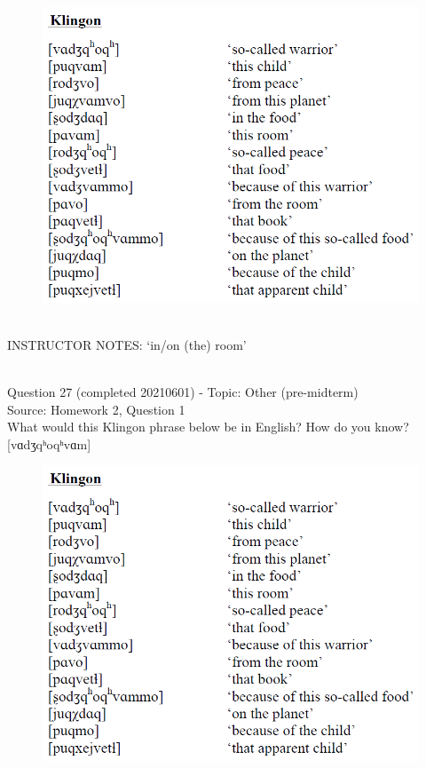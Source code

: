 \documentclass[12pt]{article}
\begin{document}
\begin{figure}[H]
\includegraphics{../images/klingon.png}
\end{figure}

~\\
INSTRUCTOR NOTES: ‘in/on (the) room’


~\\

{\large Question 27} (completed 20210601) - Topic: Other (pre-midterm)\\
Source: Homework 2, Question 1\\

What would this Klingon phrase below be in English? How do you know?\\

{[vɑdʒqʰoqʰvɑm]}

\begin{figure}[H]
\includegraphics{../images/klingon.png}
\end{figure}
\end{document}
